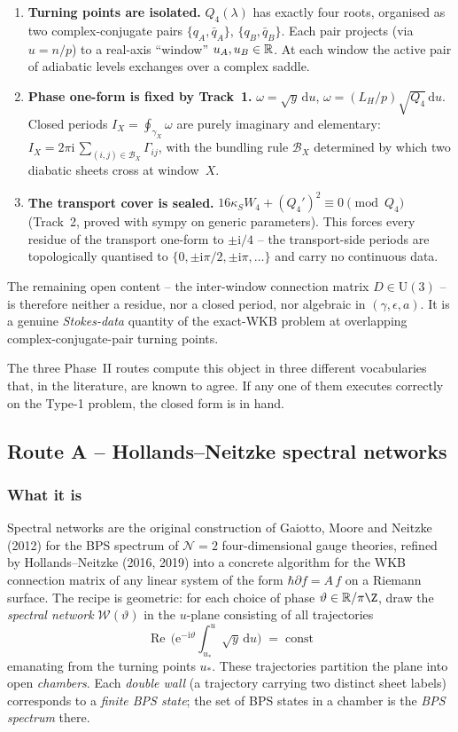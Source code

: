 \documentclass[11pt]{article}
\newcommand{\ii}{\mathrm i}\newcommand{\dd}{\mathrm d}
\newcommand{\re}{\operatorname{Re}}
\begin{document}
\begin{enumerate}
 \item \textbf{Turning points are isolated.} $Q_4(\lambda)$ has exactly
 four roots, organised as two complex-conjugate pairs $\{q_A,\bar q_A\}$,
 $\{q_B,\bar q_B\}$. Each pair projects (via $u=n/p$) to a real-axis
 ``window'' $u_A, u_B \in \mathbb R$. At each window the active pair of
 adiabatic levels exchanges over a complex saddle.
 \item \textbf{Phase one-form is fixed by Track~1.}
 $\omega = \sqrt y\,\dd u$, $\omega = (L_H/p)\sqrt{Q_4}\,\dd u$. Closed
 periods $I_X = \oint_{\gamma_X}\omega$ are purely imaginary and
 elementary:
 $I_X = 2\pi\ii\,\sum_{(i,j)\in\mathcal B_X}\Gamma_{ij}$,
 with the bundling rule $\mathcal B_X$ determined by which two diabatic
 sheets cross at window~$X$.
 \item \textbf{The transport cover is sealed.}
 $16\kappa_S W_4 + (Q_4')^2 \equiv 0 \pmod{Q_4}$ (Track~2, proved with
 sympy on generic parameters). This forces every residue of the
 transport one-form to $\pm\ii/4$ -- the transport-side periods are
 topologically quantised to $\{0,\pm\ii\pi/2,\pm\ii\pi,\ldots\}$ and
 carry no continuous data.
\end{enumerate}

The remaining open content -- the inter-window connection matrix
$D\in\mathrm U(3)$ -- is therefore neither a residue, nor a closed
period, nor algebraic in $(\gamma,\epsilon,a)$. It is a genuine
\emph{Stokes-data} quantity of the exact-WKB problem at overlapping
complex-conjugate-pair turning points.

The three Phase~II routes compute this object in three different
vocabularies that, in the literature, are known to agree. If any one
of them executes correctly on the Type-1 problem, the closed form is
in hand.

\subsection{Route A -- Hollands--Neitzke spectral networks}
\label{sec:route-a}

\subsubsection*{What it is}

Spectral networks are the original construction of Gaiotto, Moore and
Neitzke (2012) for the BPS spectrum of $\mathcal N=2$ four-dimensional
gauge theories, refined by Hollands--Neitzke (2016, 2019) into a
concrete algorithm for the WKB connection matrix of any linear system
of the form $\hbar\partial f = A\,f$ on a Riemann surface. The recipe
is geometric: for each choice of phase $\vartheta\in\mathbb R/\pi\Z$,
draw the \emph{spectral network} $\mathcal W(\vartheta)$ in the
$u$-plane consisting of all trajectories
\[
\re\,\bigl(\mathrm e^{-\ii\vartheta}\int_{u_*}^{u}\sqrt y\,\dd u\bigr)
\;=\; \text{const}
\]
emanating from the turning points $u_*$. These trajectories partition
the plane into open \emph{chambers}. Each \emph{double wall} (a
trajectory carrying two distinct sheet labels) corresponds to a
\emph{finite BPS state}; the set of BPS states in a chamber is the
\emph{BPS spectrum} there.
\end{document}
